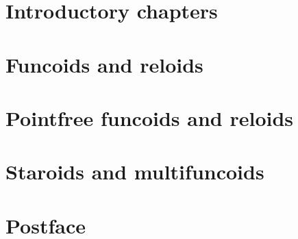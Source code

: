 \documentclass[letterpaper,oneside,english,reqno]{amsbook}
\numberwithin{section}{chapter}
\begin{document}

\maketitle

\tableofcontents{}

\part{Introductory chapters}







\part{Funcoids and reloids}














\part{Pointfree funcoids and reloids}



\part{Staroids and multifuncoids}



\part{Postface}






\printindex{}




\addtocounter{figure}{-1}
\label{LASTFIGURE}
\end{document}
